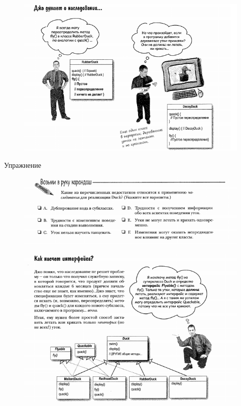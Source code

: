 \documentclass{beamer}
\begin{document}
\begin{frame}
\begin{figure}[h]
\centering
\includegraphics[scale=0.5]{images/lec09-pic05.png}
\label{pic-sort}
\end{figure}
\end{frame}

\begin{frame}{Упражнение}
\begin{figure}[h]
\centering
\includegraphics[scale=0.75]{images/lec09-pic06.png}
\label{pic-sort}
\end{figure}
\end{frame}

\begin{frame}
\begin{figure}[h]
\centering
\includegraphics[scale=0.75]{images/lec09-pic07.png}
\label{pic-sort}
\end{figure}
\end{frame}
\end{document}
